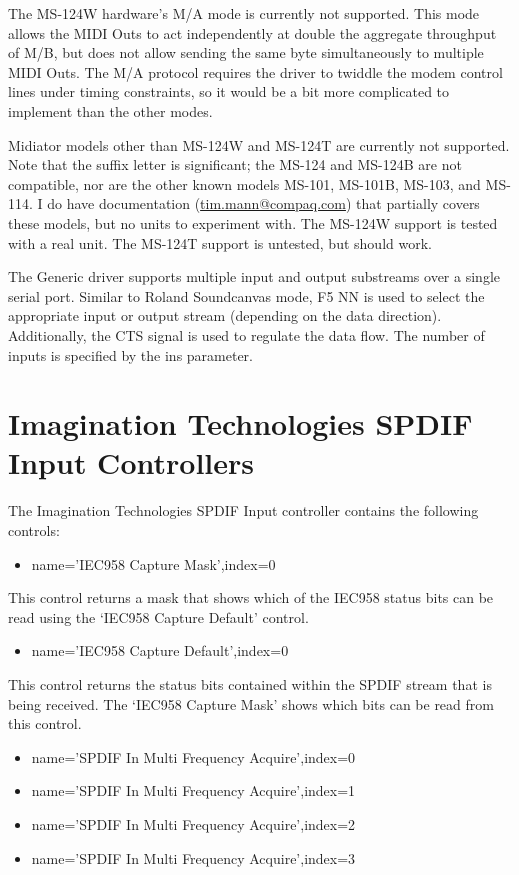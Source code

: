 \documentclass[a4paper,8pt,english]{sphinxmanual}
\begin{document}
The MS-124W hardware's M/A mode is currently not supported. This mode allows
the MIDI Outs to act independently at double the aggregate throughput of M/B,
but does not allow sending the same byte simultaneously to multiple MIDI Outs.
The M/A protocol requires the driver to twiddle the modem control lines under
timing constraints, so it would be a bit more complicated to implement than
the other modes.

Midiator models other than MS-124W and MS-124T are currently not supported.
Note that the suffix letter is significant; the MS-124 and MS-124B are not
compatible, nor are the other known models MS-101, MS-101B, MS-103, and MS-114.
I do have documentation (\href{mailto:tim.mann@compaq.com}{tim.mann@compaq.com}) that partially covers these models,
but no units to experiment with.  The MS-124W support is tested with a real unit.
The MS-124T support is untested, but should work.

The Generic driver supports multiple input and output substreams over a single
serial port.  Similar to Roland Soundcanvas mode, F5 NN is used to select the
appropriate input or output stream (depending on the data direction).
Additionally, the CTS signal is used to regulate the data flow.  The number of
inputs is specified by the ins parameter.


\section{Imagination Technologies SPDIF Input Controllers}
\label{sound/cards/img-spdif-in::doc}\label{sound/cards/img-spdif-in:imagination-technologies-spdif-input-controllers}
The Imagination Technologies SPDIF Input controller contains the following
controls:
\begin{itemize}
\item {} 
name='IEC958 Capture Mask',index=0

\end{itemize}

This control returns a mask that shows which of the IEC958 status bits
can be read using the `IEC958 Capture Default' control.
\begin{itemize}
\item {} 
name='IEC958 Capture Default',index=0

\end{itemize}

This control returns the status bits contained within the SPDIF stream that
is being received. The `IEC958 Capture Mask' shows which bits can be read
from this control.
\begin{itemize}
\item {} 
name='SPDIF In Multi Frequency Acquire',index=0

\item {} 
name='SPDIF In Multi Frequency Acquire',index=1

\item {} 
name='SPDIF In Multi Frequency Acquire',index=2

\item {} 
name='SPDIF In Multi Frequency Acquire',index=3

\end{itemize}
\end{document}
